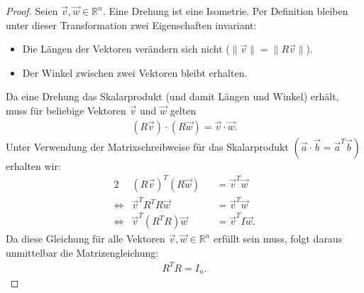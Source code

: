 \begin{proof}
    Seien $\vec{v}, \vec{w} \in \mathbb{R}^n$. Eine Drehung ist eine Isometrie. Per Definition bleiben unter dieser Transformation zwei Eigenschaften invariant:
\begin{itemize}
    \item Die Längen der Vektoren verändern sich nicht ($\|\vec{v}\| = \|R\vec{v}\|$).
    \item Der Winkel zwischen zwei Vektoren bleibt erhalten.
\end{itemize}
Da eine Drehung das Skalarprodukt (und damit Längen und Winkel) erhält, muss für beliebige Vektoren $\vec{v}$ und $\vec{w}$ gelten
\begin{align*}
    (R\vec{v}) \cdot (R\vec{w}) = \vec{v} \cdot \vec{w}.
\end{align*}
Unter Verwendung der Matrixschreibweise für das Skalarprodukt $(\vec{a} \cdot \vec{b} = \vec{a}^T \vec{b})$ erhalten wir:
\begin{alignat*}{2}
    & (R\vec{v})^T (R\vec{w}) &&= \vec{v}^T\vec{w} \\
    \iff & \vec{v}^T R^T R \vec{w} &&= \vec{v}^T\vec{w} \\
    \iff & \vec{v}^T (R^T R) \vec{w} &&= \vec{v}^T I \vec{w}.
\end{alignat*}
Da diese Gleichung für alle Vektoren $\vec{v}, \vec{w} \in \mathbb{R}^n$ erfüllt sein muss, folgt daraus unmittelbar die Matrizengleichung:
\begin{align}
    R^T R = I_n. \nonumber
\end{align}
\end{proof}

